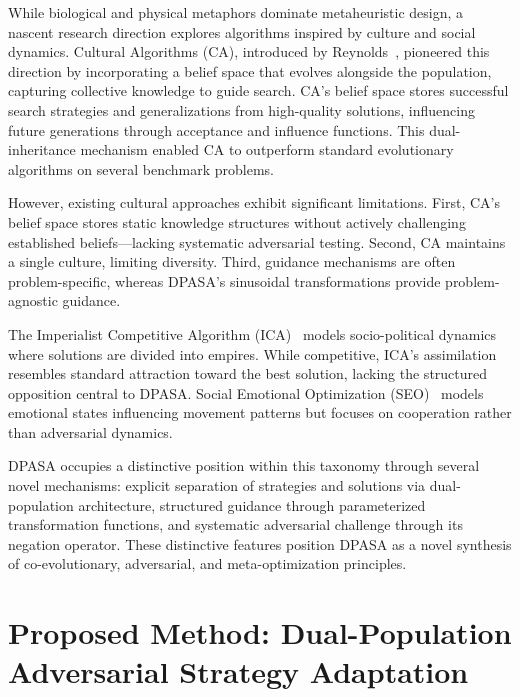 \documentclass[11pt]{article}
\begin{document}

While biological and physical metaphors dominate metaheuristic design, a nascent research direction explores algorithms inspired by culture and social dynamics. Cultural Algorithms (CA), introduced by Reynolds~\citep{reynolds1994introduction}, pioneered this direction by incorporating a belief space that evolves alongside the population, capturing collective knowledge to guide search. CA's belief space stores successful search strategies and generalizations from high-quality solutions, influencing future generations through acceptance and influence functions. This dual-inheritance mechanism enabled CA to outperform standard evolutionary algorithms on several benchmark problems.

However, existing cultural approaches exhibit significant limitations. First, CA's belief space stores static knowledge structures without actively challenging established beliefs---lacking systematic adversarial testing. Second, CA maintains a single culture, limiting diversity. Third, guidance mechanisms are often problem-specific, whereas DPASA's sinusoidal transformations provide problem-agnostic guidance.

The Imperialist Competitive Algorithm (ICA)~\citep{atashpaz2007imperialist} models socio-political dynamics where solutions are divided into empires. While competitive, ICA's assimilation resembles standard attraction toward the best solution, lacking the structured opposition central to DPASA. Social Emotional Optimization (SEO)~\citep{xu2010social} models emotional states influencing movement patterns but focuses on cooperation rather than adversarial dynamics.

DPASA occupies a distinctive position within this taxonomy through several novel mechanisms: explicit separation of strategies and solutions via dual-population architecture, structured guidance through parameterized transformation functions, and systematic adversarial challenge through its negation operator. These distinctive features position DPASA as a novel synthesis of co-evolutionary, adversarial, and meta-optimization principles.



\section{Proposed Method: Dual-Population Adversarial Strategy Adaptation}
\label{sec:method}
\end{document}

